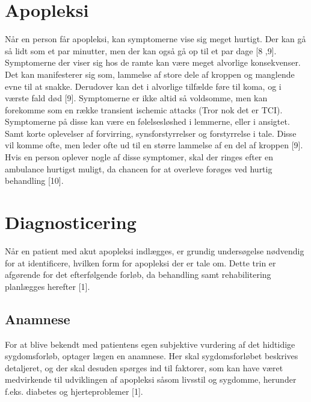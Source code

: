 \section{Apopleksi}

Når en person får apopleksi, kan symptomerne vise sig meget hurtigt. Der kan gå så lidt som et par minutter, men der kan også gå op til et par dage [8 ,9]. Symptomerne der viser sig hos de ramte kan være meget alvorlige konsekvenser. Det kan manifesterer sig som, lammelse af store dele af kroppen og manglende evne til at snakke. Derudover kan det i alvorlige tilfælde føre til koma, og i værste fald død [9]. Symptomerne er ikke altid så voldsomme, men kan forekomme som en række transient ischemic attacks (Tror nok det er TCI). Symptomerne på disse kan være en følelsesløshed i lemmerne, eller i ansigtet. Samt korte oplevelser af forvirring, synsforstyrrelser og forstyrrelse i tale. Disse vil komme ofte, men leder ofte ud til en større lammelse af en del af kroppen [9].
Hvis en person oplever nogle af disse symptomer, skal der ringes efter en ambulance hurtigst muligt, da chancen for at overleve forøges ved hurtig behandling [10]. 


\section{Diagnosticering}

Når en patient med akut apopleksi indlægges, er grundig undersøgelse nødvendig for at identificere, hvilken form for apopleksi der er tale om. Dette trin er afgørende for det efterfølgende forløb, da behandling samt rehabilitering planlægges herefter [1].

\subsection{Anamnese}
For at blive bekendt med patientens egen subjektive vurdering af det hidtidige sygdomsforløb, optager lægen en anamnese. Her skal sygdomsforløbet  beskrives detaljeret, og der skal desuden spørges ind til faktorer, som kan have været medvirkende til udviklingen af apopleksi såsom livsstil og sygdomme, herunder f.eks. diabetes og hjerteproblemer [1].

